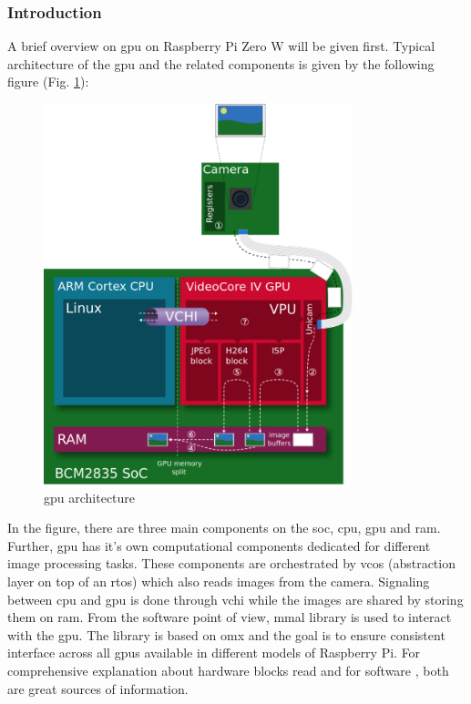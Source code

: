 \subsubsection{Introduction}
A brief overview on \ac{gpu} on Raspberry Pi Zero W will be given first. Typical architecture of the \ac{gpu} and the related components is given by the following figure (Fig. \ref{fig:physical:gpu_architecture}):
 
 \begin{figure}[H]
    \centering
    \includegraphics[width=0.8\textwidth]{physical/figures/gpu_architecture}
    \caption{\ac{gpu} architecture \cite{noauthor_videocore_nodate-1}}
    \label{fig:physical:gpu_architecture}
\end{figure}

In the figure, there are three main components on the \ac{soc}, \ac{cpu}, \ac{gpu} and \ac{ram}.
Further, \ac{gpu} has it's own computational components dedicated for different image processing tasks.
These components are orchestrated by \ac{vcos} (abstraction layer on top of an \ac{rtos}) which also reads images from the camera.
Signaling between \ac{cpu} and \ac{gpu} is done through \ac{vchi} while the images are shared by storing them on \ac{ram}.
From the software point of view, \ac{mmal} library is used to interact with the \ac{gpu}.
The library is based on \ac{omx} and the goal is to ensure consistent interface across all \acp{gpu} available in different models of Raspberry Pi.
For comprehensive explanation about hardware blocks read \cite{noauthor_videocore_nodate-1} and for software \cite{noauthor_videocore_nodate}, both are great sources of information.

